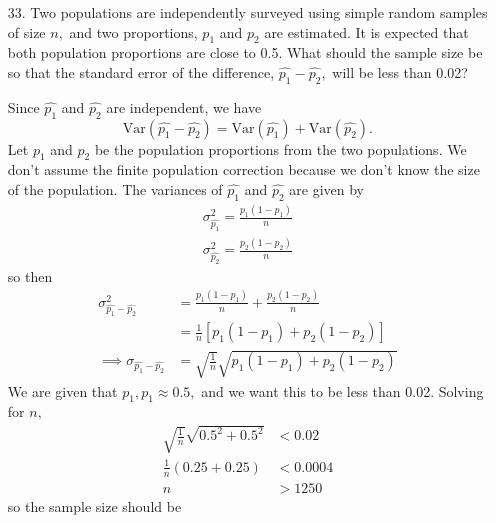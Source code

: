 \documentclass{article}
\newcommand{\var}{\mathrm{Var}}
\begin{document}
\begin{itemize}
	\item[33.] Two populations are independently surveyed using simple random samples of size $n,$ and two proportions, $p_1$ and $p_2$ are estimated. It is expected that both population proportions are close to 0.5. What should the sample size be so that the standard error of the difference, $\hat{p_1}-\hat{p_2},$ will be less than 0.02?
		\begin{soln}
			Since $\hat{p_1}$ and $\hat{p_2}$ are independent, we have \[\var(\hat{p_1}-\hat{p_2})=\var(\hat{p_1})+\var(\hat{p_2}).\] Let $p_1$ and $p_2$ be the population proportions from the two populations. We don't assume the finite population correction because we don't know the size of the population. The variances of $\hat{p_1}$ and $\hat{p_2}$ are given by 
			\begin{align*}
				\sigma_{\hat{p_1}}^2 = \frac{p_1(1-p_1)}{n} \\
				\sigma_{\hat{p_2}}^2 = \frac{p_2(1-p_2)}{n}
			\end{align*} so then 
			\begin{align*}
				\sigma_{\hat{p_1}-\hat{p_2}}^2 &= \frac{p_1(1-p_1)}{n}+ \frac{p_2(1-p_2)}{n} \\
				&= \frac{1}{n}\left[ p_1(1-p_1)+p_2(1-p_2) \right] \\
				\implies \sigma_{\hat{p_1}-\hat{p_2}} &= \sqrt{\frac{1}{n}} \sqrt{p_1(1-p_1) + p_2(1-p_2)}
			\end{align*} We are given that $p_1, p_1\approx 0.5,$ and we want this to be less than 0.02. Solving for $n,$
			\begin{align*}
				\sqrt{\frac{1}{n}}\sqrt{0.5^2+0.5^2}&<0.02 \\
				\frac{1}{n}(0.25+0.25) &< 0.0004 \\
				n &> 1250
			\end{align*} so the sample size should be 

		\end{soln}


\end{itemize}
\end{document}
